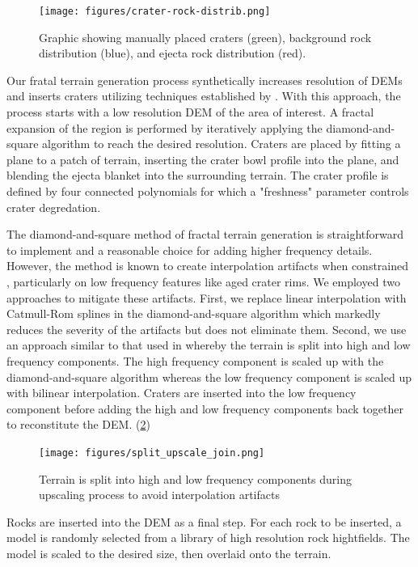 \documentclass[twocolumn,letterpaper]{IEEEAerospaceCLS}  %
\begin{document}
\begin{figure}[h!]
  \texttt{[image: figures/crater-rock-distrib.png]}
  \caption{Graphic showing manually placed craters (green), background rock distribution (blue), and ejecta rock distribution (red).}
  \label{fig:crater-rock-distrib}
\end{figure}

Our fratal terrain generation process synthetically increases resolution of DEMs and inserts craters utilizing techniques established by \cite{parkes2004planet}.  
With this approach, the process starts with a low resolution DEM of the area of interest.
A fractal expansion of the region is performed by iteratively applying the diamond-and-square algorithm to reach the desired resolution.  
Craters are placed by fitting a plane to a patch of terrain, inserting the crater bowl profile into the plane, and blending the ejecta blanket into the surrounding terrain.  
The crater profile is defined by four connected polynomials for which a "freshness" parameter controls crater degredation.  

The diamond-and-square method of fractal terrain generation is straightforward to implement and a reasonable choice for adding higher frequency details.  
However, the method is known to create interpolation artifacts when constrained \cite{miller1986definition}, particularly on low frequency features like aged crater rims.  
We employed two approaches to mitigate these artifacts.  
First, we replace linear interpolation with Catmull-Rom splines in the diamond-and-square algorithm which markedly reduces the severity of the artifacts but does not eliminate them.
Second, we use an approach similar to that used in \cite{shankar2008lunar} whereby the terrain is split into high and low frequency components.
The high frequency component is scaled up with the diamond-and-square algorithm whereas the low frequency component is scaled up with bilinear interpolation.  
Craters are inserted into the low frequency component before adding the high and low frequency components back together to reconstitute the DEM.  (\cref{fig:split_upscale_join})

\begin{figure}[h!]
  \texttt{[image: figures/split\_upscale\_join.png]}
    \caption{Terrain is split into high and low frequency components during upscaling process to avoid interpolation artifacts}
    \label{fig:split_upscale_join}
\end{figure}

Rocks are inserted into the DEM as a final step.  For each rock to be inserted, a model is randomly selected from a library of high resolution rock hightfields.  The model is scaled to the desired size, then overlaid onto the terrain.
\end{document}
